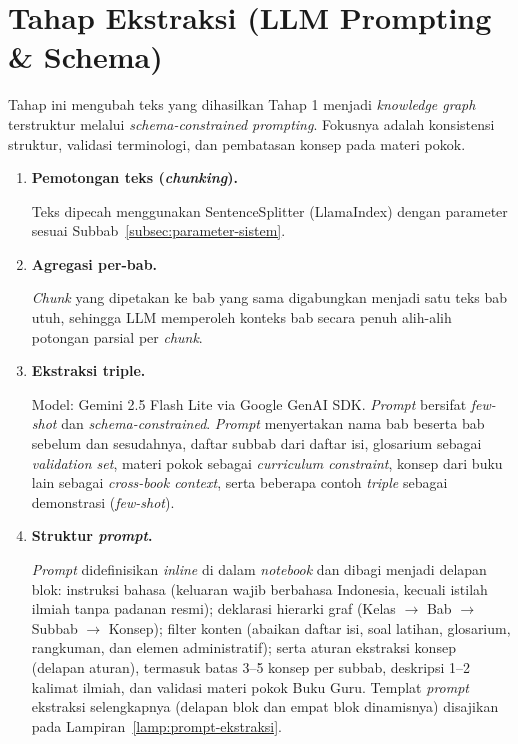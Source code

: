 \documentclass[main]{subfiles}
\begin{document}
\section{Tahap Ekstraksi (LLM Prompting \& Schema)}\label{sec:ekstraksi}

Tahap ini mengubah teks yang dihasilkan Tahap 1 menjadi \textit{knowledge
graph} terstruktur melalui \textit{schema-constrained prompting}.
Fokusnya adalah konsistensi struktur, validasi terminologi, dan
pembatasan konsep pada materi pokok.

\begin{enumerate}
  \item \textbf{Pemotongan teks (\textit{chunking}).}

  Teks dipecah menggunakan SentenceSplitter (LlamaIndex) dengan parameter
  sesuai Subbab~\ref{subsec:parameter-sistem}.

  \item \textbf{Agregasi per-bab.}

  \textit{Chunk} yang dipetakan ke bab yang sama digabungkan menjadi satu teks
  bab utuh, sehingga LLM memperoleh konteks bab secara penuh alih-alih potongan
  parsial per \textit{chunk}.

  \item \textbf{Ekstraksi triple.}

  Model: Gemini 2.5 Flash Lite via Google GenAI SDK. \textit{Prompt} bersifat
  \textit{few-shot} dan \textit{schema-constrained}. \textit{Prompt} menyertakan nama bab 
  beserta bab sebelum dan sesudahnya, daftar subbab dari daftar isi, glosarium sebagai 
  \textit{validation set}, materi pokok sebagai \textit{curriculum constraint}, konsep dari 
  buku lain sebagai \textit{cross-book context}, serta beberapa contoh \textit{triple} sebagai
  demonstrasi (\textit{few-shot}).

  \item \textbf{Struktur \textit{prompt}.}

  \textit{Prompt} didefinisikan \textit{inline} di dalam \textit{notebook} dan dibagi menjadi delapan blok:
  instruksi bahasa (keluaran wajib berbahasa Indonesia, kecuali istilah ilmiah
  tanpa padanan resmi); deklarasi hierarki graf (Kelas $\to$ Bab $\to$ Subbab
  $\to$ Konsep); filter konten (abaikan daftar isi, soal latihan, glosarium,
  rangkuman, dan elemen administratif); serta aturan ekstraksi konsep (delapan
  aturan), termasuk batas 3--5 konsep per subbab, deskripsi 1--2 kalimat ilmiah,
  dan validasi materi pokok Buku Guru. Templat \textit{prompt} ekstraksi
  selengkapnya (delapan blok dan empat blok dinamisnya) disajikan pada
  Lampiran~\ref{lamp:prompt-ekstraksi}.


\end{enumerate}
\end{document}
